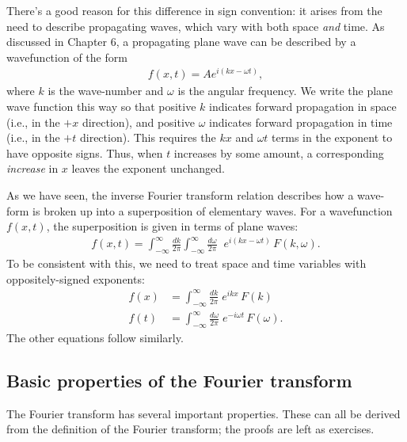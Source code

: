 \documentclass[10pt,a4paper]{article}
\begin{document}
There's a good reason for this difference in sign convention: it
arises from the need to describe propagating waves, which vary with
both space \textit{and} time.  As discussed in Chapter 6, a
propagating plane wave can be described by a wavefunction of the form
\begin{align}
  f(x,t) = A e^{i(kx - \omega t)},
\end{align}
where $k$ is the wave-number and $\omega$ is the angular frequency.
We write the plane wave function this way so that positive $k$
indicates forward propagation in space (i.e., in the $+x$ direction),
and positive $\omega$ indicates forward propagation in time (i.e., in
the $+t$ direction).  This requires the $kx$ and $\omega t$ terms in
the exponent to have opposite signs. Thus, when $t$ increases by some
amount, a corresponding \textit{increase} in $x$ leaves the exponent
unchanged.

As we have seen, the inverse Fourier transform relation describes how
a wave-form is broken up into a superposition of elementary waves.
For a wavefunction $f(x,t)$, the superposition is given in terms of
plane waves:
\begin{align}
  f(x,t) = \int_{-\infty}^\infty \frac{dk}{2\pi} \int_{-\infty}^\infty \frac{d\omega}{2\pi}\;\; e^{i(kx-\omega t)}\, F(k,\omega).
\end{align}
To be consistent with this, we need to treat space and time variables
with oppositely-signed exponents:
\begin{align}
  f(x) &= \int_{-\infty}^\infty \frac{dk}{2\pi}\; e^{ikx}\, F(k) \\
  f(t) &= \int_{-\infty}^\infty \frac{d\omega}{2\pi}\; e^{-i\omega t}\, F(\omega).
\end{align}
The other equations follow similarly.

\subsection{Basic properties of the Fourier transform}
\label{fourier-basic-properties}

The Fourier transform has several important properties.  These can all
be derived from the definition of the Fourier transform; the proofs
are left as exercises.
\end{document}
